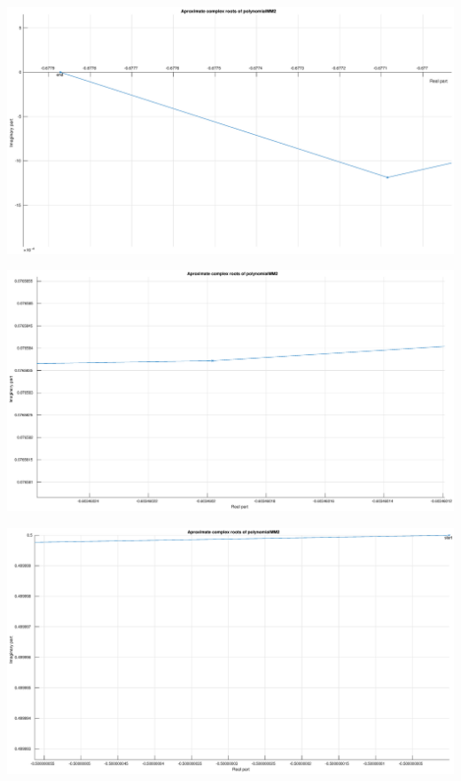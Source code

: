 \documentclass[12pt]{report}
\begin{document}
\begin{center}
   \includegraphics[scale=0.25]{task2mm2complexzommedleft.eps}
\end{center}

\begin{center}
   \includegraphics[scale=0.25]{task2mm2complexzommedmiddle.eps}
\end{center}

\begin{center}
   \includegraphics[scale=0.25]{task2mm2complexzommedup.eps}
\end{center}
\end{document}

